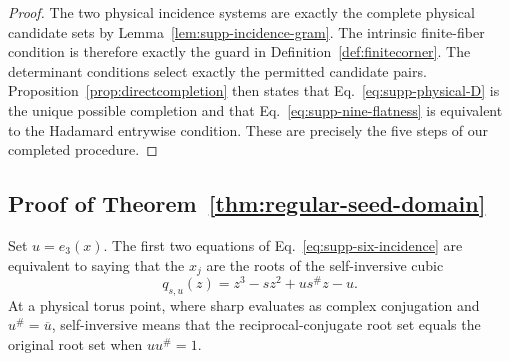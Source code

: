 \begin{proof}
The two physical incidence systems are exactly the complete physical candidate sets by Lemma~\ref{lem:supp-incidence-gram}.  The intrinsic finite-fiber condition is therefore exactly the guard in Definition~\ref{def:finitecorner}.  The determinant conditions select exactly the permitted candidate pairs. Proposition~\ref{prop:directcompletion} then states that Eq.~\eqref{eq:supp-physical-D} is the unique possible completion and that Eq.~\eqref{eq:supp-nine-flatness} is equivalent to the Hadamard entrywise condition.  These are precisely the five steps of our completed procedure.
\end{proof}

\subsection{{Proof of Theorem~\ref{thm:regular-seed-domain}}}
\label{sec:supp-generic-cover}

Set $u=e_3(x)$.  The first two equations of Eq.~\eqref{eq:supp-six-incidence} are equivalent to saying that the $x_j$ are the roots of the self-inversive cubic
\begin{equation}
q_{s,u}(z)=z^3-sz^2+us^\#z-u.
\label{eq:supp-product-cubic}
\end{equation}
At a physical torus point, where sharp evaluates as complex conjugation and $u^\#=\overline u$, self-inversive means that the reciprocal-conjugate root set equals the original root set when $uu^\#=1$.

